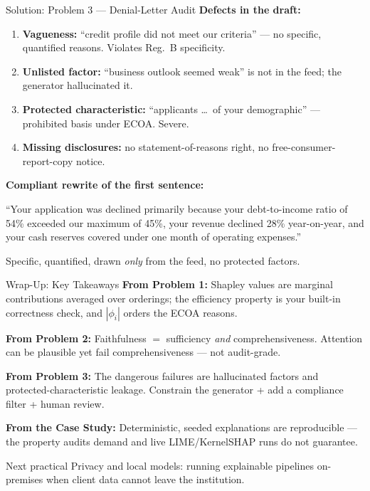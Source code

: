 \documentclass[9pt,t]{beamer}
\begin{document}
\begin{frame}{Solution: Problem 3 --- Denial-Letter Audit}
\textbf{Defects in the draft:}
\begin{enumerate}\small
  \item \textbf{Vagueness:} ``credit profile did not meet our criteria'' --- no
        specific, quantified reasons. Violates Reg.\ B specificity.
  \item \textbf{Unlisted factor:} ``business outlook seemed weak'' is not in the
        feed; the generator hallucinated it.
  \item \textbf{Protected characteristic:} ``applicants \ldots\ of your
        demographic'' --- prohibited basis under ECOA. Severe.
  \item \textbf{Missing disclosures:} no statement-of-reasons right, no
        free-consumer-report-copy notice.
\end{enumerate}

\medskip
\textbf{Compliant rewrite of the first sentence:}
\begin{exampleblock}{}
``Your application was declined primarily because your debt-to-income ratio of
54\% exceeded our maximum of 45\%, your revenue declined 28\% year-on-year, and
your cash reserves covered under one month of operating expenses.''
\end{exampleblock}
Specific, quantified, drawn \emph{only} from the feed, no protected factors.
\end{frame}

\begin{frame}{Wrap-Up: Key Takeaways}
\textbf{From Problem 1:} Shapley values are marginal contributions averaged over
orderings; the efficiency property is your built-in correctness check, and
$|\phi_i|$ orders the ECOA reasons.

\medskip
\textbf{From Problem 2:} Faithfulness $=$ sufficiency \emph{and} comprehensiveness.
Attention can be plausible yet fail comprehensiveness --- not audit-grade.

\medskip
\textbf{From Problem 3:} The dangerous failures are hallucinated factors and
protected-characteristic leakage. Constrain the generator + add a compliance
filter + human review.

\medskip
\textbf{From the Case Study:} Deterministic, seeded explanations are reproducible
--- the property audits demand and live LIME/KernelSHAP runs do not guarantee.

\medskip
\begin{block}{Next practical}
Privacy and local models: running explainable pipelines on-premises when client
data cannot leave the institution.
\end{block}
\end{frame}
\end{document}
